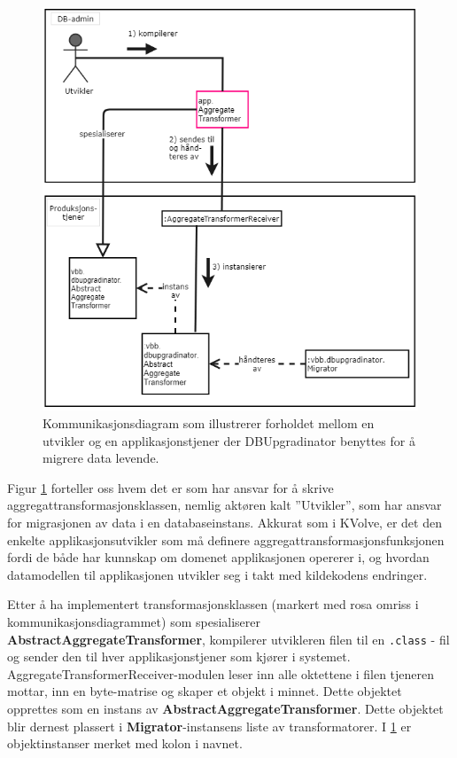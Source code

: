 \begin{figure}[hbtp]
  \centering
  \includegraphics[scale=0.6]{fig/dbupgradinator-logisk-2.png}
  \caption{Kommunikasjonsdiagram som illustrerer forholdet mellom en utvikler og en applikasjonstjener der DBUpgradinator benyttes for å migrere data levende.}
  \label{fig6}
\end{figure}

Figur \ref{fig6} forteller oss hvem det er som har ansvar for å skrive aggregat\-transformasjonsklassen, nemlig aktøren kalt ''Utvikler'', som har ansvar for migrasjonen av data i en databaseinstans. Akkurat som i KVolve, er det den enkelte applikasjonsutvikler som må definere aggregat\-transformasjons\-funksjonen fordi de både har kunnskap om domenet applikasjonen opererer i, og hvordan datamodellen til applikasjonen utvikler seg i takt med kildekodens endringer.

Etter å ha implementert transformasjonsklassen (markert med rosa omriss i kommunikasjonsdiagrammet) som spesialiserer \textbf{AbstractAggregateTransformer}, kompilerer utvikleren filen til en \texttt{.class} - fil og sender den til hver applikasjonstjener som kjører i systemet. AggregateTransformerReceiver-modulen leser inn alle oktettene i filen tjeneren mottar, inn en byte-matrise og skaper et objekt i minnet. Dette objektet opprettes som en instans av \textbf{AbstractAggregateTransformer}. Dette objektet blir dernest plassert i \textbf{Migrator}-instansens liste av transformatorer. I \ref{fig6} er objektinstanser merket med kolon i navnet.

